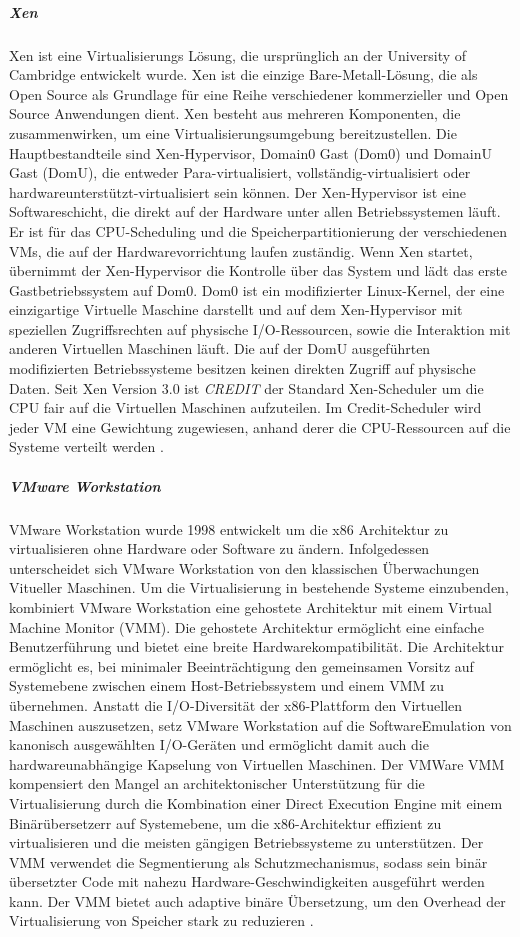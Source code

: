 \subparagraph {Xen}
Xen ist eine Virtualisierungs Lösung, die ursprünglich an der University of Cambridge entwickelt wurde. Xen ist die einzige Bare-Metall-Lösung, die als Open Source als Grundlage für eine Reihe verschiedener kommerzieller und Open Source Anwendungen dient. Xen besteht aus mehreren Komponenten, die zusammenwirken, um eine Virtualisierungsumgebung bereitzustellen. Die Hauptbestandteile sind Xen-Hypervisor, Domain0 Gast (Dom0) und DomainU Gast (DomU), die entweder Para-virtualisiert, vollständig-virtualisiert oder hardwareunterstützt-virtualisiert sein können. Der Xen-Hypervisor ist eine Softwareschicht, die direkt auf der Hardware unter allen Betriebssystemen läuft. Er ist für das CPU-Scheduling und die Speicherpartitionierung der verschiedenen VMs, die auf der Hardwarevorrichtung laufen zuständig. Wenn Xen startet, übernimmt der Xen-Hypervisor die Kontrolle über das System und lädt das erste Gastbetriebssystem auf Dom0. Dom0 ist ein modifizierter Linux-Kernel, der eine einzigartige Virtuelle Maschine darstellt und auf dem Xen-Hypervisor mit speziellen Zugriffsrechten auf physische I/O-Ressourcen, sowie die Interaktion mit anderen Virtuellen Maschinen läuft. Die auf der DomU ausgeführten modifizierten Betriebssysteme besitzen keinen direkten Zugriff auf physische Daten. Seit Xen Version 3.0 ist \emph{CREDIT} der Standard Xen-Scheduler um die CPU fair auf die Virtuellen Maschinen aufzuteilen. Im Credit-Scheduler wird jeder VM eine Gewichtung zugewiesen, anhand derer die CPU-Ressourcen auf die Systeme verteilt werden \cite{Fayyad-Kazan2013BenchmarkingHypervisors}. 

\subparagraph {VMware Workstation}
VMware Workstation wurde 1998 entwickelt um die x86 Architektur zu virtualisieren ohne Hardware oder Software zu ändern. Infolgedessen unterscheidet sich VMware Workstation von den klassischen Überwachungen Vitueller Maschinen. Um die Virtualisierung in bestehende Systeme einzubenden, kombiniert VMware Workstation eine gehostete Architektur mit einem Virtual Machine Monitor (VMM). Die gehostete Architektur ermöglicht eine einfache Benutzerführung und bietet eine breite Hardwarekompatibilität. Die Architektur ermöglicht es, bei minimaler Beeinträchtigung den gemeinsamen Vorsitz auf Systemebene zwischen einem Host-Betriebssystem und einem VMM zu übernehmen. Anstatt die I/O-Diversität der x86-Plattform den Virtuellen Maschinen auszusetzen, setz VMware Workstation auf die SoftwareEmulation von kanonisch ausgewählten I/O-Geräten und ermöglicht damit auch die hardwareunabhängige Kapselung von Virtuellen Maschinen. Der VMWare VMM kompensiert den Mangel an architektonischer Unterstützung für die Virtualisierung durch die Kombination einer Direct Execution Engine mit einem Binärübersetzerr auf Systemebene, um die x86-Architektur effizient zu virtualisieren und die meisten gängigen Betriebssysteme zu unterstützen. Der VMM verwendet die Segmentierung als Schutzmechanismus, sodass sein binär übersetzter Code mit nahezu Hardware-Geschwindigkeiten ausgeführt werden kann. Der VMM bietet auch adaptive binäre Übersetzung, um den Overhead der Virtualisierung von Speicher stark zu reduzieren \cite{Bugnion2012BringingWorkstation}.


